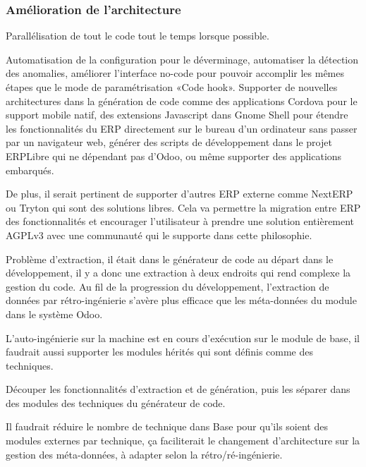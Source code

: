 
\subsubsection{Amélioration de l’architecture}
Parallélisation de tout le code tout le temps lorsque possible.

Automatisation de la configuration pour le déverminage, automatiser la détection des anomalies, améliorer l’interface no-code pour pouvoir accomplir les mêmes étapes que le mode de paramétrisation «Code hook». Supporter de nouvelles architectures dans la génération de code comme des applications Cordova pour le support mobile natif, des extensions Javascript dans Gnome Shell pour étendre les fonctionnalités du ERP directement sur le bureau d’un ordinateur sans passer par un navigateur web, générer des scripts de développement dans le projet ERPLibre qui ne dépendant pas d’Odoo, ou même supporter des applications embarqués.

De plus, il serait pertinent de supporter d’autres ERP externe comme NextERP ou Tryton qui sont des solutions libres. Cela va permettre la migration entre ERP des fonctionnalités et encourager l’utilisateur à prendre une solution entièrement AGPLv3 avec une communauté qui le supporte dans cette philosophie.

Problème d’extraction, il était dans le générateur de code au départ dans le développement, il y a donc une extraction à deux endroits qui rend complexe la gestion du code. Au fil de la progression du développement, l’extraction de données par rétro-ingénierie s’avère plus efficace que les méta-données du module dans le système Odoo.

L’auto-ingénierie sur la machine est en cours d’exécution sur le module de base, il faudrait aussi supporter les modules hérités qui sont définis comme des techniques.

Découper les fonctionnalités d'extraction et de génération, puis les séparer dans des modules des techniques du générateur de code.

Il faudrait réduire le nombre de technique dans Base pour qu’ils soient des modules externes par technique, ça faciliterait le changement d’architecture sur la gestion des méta-données, à adapter selon la rétro/ré-ingénierie.


